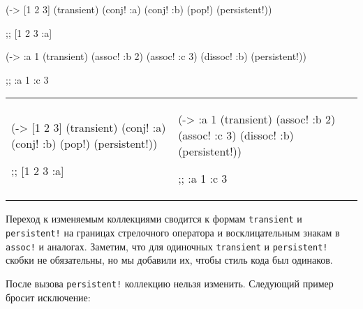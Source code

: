 \ifx\DEVICETYPE\MOBILE

\begin{english}

  \begin{clojure}
(-> [1 2 3]
    (transient)
    (conj! :a)
    (conj! :b)
    (pop!)
    (persistent!))

;; [1 2 3 :a]
  \end{clojure}

\splitter

  \begin{clojure}
(-> {:a 1}
    (transient)
    (assoc! :b 2)
    (assoc! :c 3)
    (dissoc! :b)
    (persistent!))

;; {:a 1 :c 3}
  \end{clojure}

\end{english}

\else

\begin{english}

\noindent
\begin{tabular}{ @{}p{5cm} @{}p{5cm} }

  \begin{clojure}
(-> [1 2 3]
    (transient)
    (conj! :a)
    (conj! :b)
    (pop!)
    (persistent!))

;; [1 2 3 :a]
  \end{clojure}

&

  \begin{clojure}
(-> {:a 1}
    (transient)
    (assoc! :b 2)
    (assoc! :c 3)
    (dissoc! :b)
    (persistent!))

;; {:a 1 :c 3}
  \end{clojure}

\end{tabular}

\end{english}

\fi

Переход к изменяемым коллекциями сводится к формам \verb|transient| и
\verb|persistent!| на границах стрелочного оператора и восклицательным знакам в
\verb|assoc!| и аналогах. Заметим, что для одиночных \verb|transient| и
\verb|persistent!| скобки не обязательны, но мы добавили их, чтобы стиль кода
был одинаков.

После вызова \verb|persistent!| коллекцию нельзя изменить. Следующий пример
бросит исключение:

\ifx\DEVICETYPE\MOBILE

